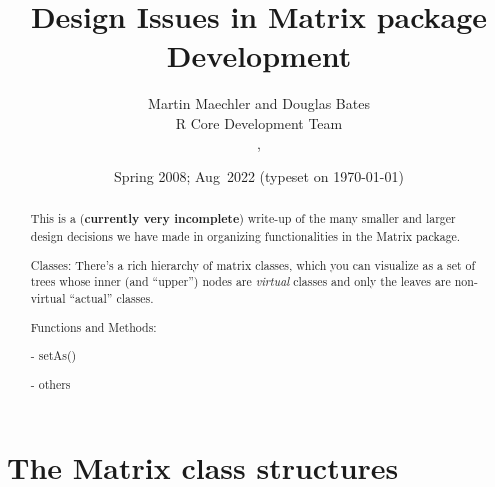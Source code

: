 \documentclass{article}
\title{Design Issues in Matrix package Development}
\author{Martin Maechler and Douglas Bates\\R Core Development Team
  \\\email{maechler@stat.math.ethz.ch}, \email{bates@r-project.org}}
\date{Spring 2008; Aug~2022 ({\tiny typeset on \tiny\today})}
\begin{document}

\begin{abstract}
This is a (\textbf{currently very incomplete}) write-up of the many smaller and
larger design decisions we have made in organizing functionalities in the
Matrix package.

Classes: There's a rich hierarchy of matrix classes, which you can
visualize as a set of trees whose inner (and ``upper'') nodes are
\emph{virtual} classes and only the leaves are non-virtual ``actual'' classes.

Functions and Methods:

- setAs()

- others

\end{abstract}

\section{The Matrix class structures}
\label{sec:classes}
\end{document}
